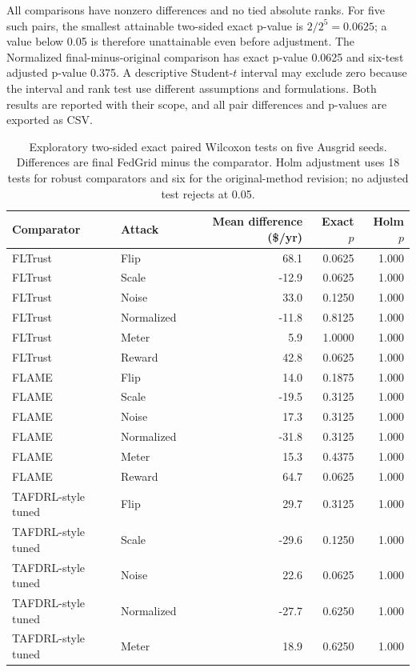 \documentclass[preprint,12pt,a4paper]{elsarticle}
\begin{document}
All comparisons have nonzero differences and no tied absolute ranks. For five such pairs, the smallest attainable two-sided exact p-value is $2/2^5=0.0625$; a value below 0.05 is therefore unattainable even before adjustment. The Normalized final-minus-original comparison has exact p-value 0.0625 and six-test adjusted p-value 0.375. A descriptive Student-$t$ interval may exclude zero because the interval and rank test use different assumptions and formulations. Both results are reported with their scope, and all pair differences and p-values are exported as CSV.

\begin{table}[htbp]
\centering\small
\caption{Exploratory two-sided exact paired Wilcoxon tests on five Ausgrid seeds. Differences are final FedGrid minus the comparator. Holm adjustment uses 18 tests for robust comparators and six for the original-method revision; no adjusted test rejects at 0.05.}
\label{tab:exact_statistics}
\begin{tabular}{llrrr}
\toprule
Comparator & Attack & Mean difference (\$/yr) & Exact $p$ & Holm $p$ \\
\midrule
FLTrust & Flip & 68.1 & 0.0625 & 1.000 \\
FLTrust & Scale & -12.9 & 0.0625 & 1.000 \\
FLTrust & Noise & 33.0 & 0.1250 & 1.000 \\
FLTrust & Normalized & -11.8 & 0.8125 & 1.000 \\
FLTrust & Meter & 5.9 & 1.0000 & 1.000 \\
FLTrust & Reward & 42.8 & 0.0625 & 1.000 \\
FLAME & Flip & 14.0 & 0.1875 & 1.000 \\
FLAME & Scale & -19.5 & 0.3125 & 1.000 \\
FLAME & Noise & 17.3 & 0.3125 & 1.000 \\
FLAME & Normalized & -31.8 & 0.3125 & 1.000 \\
FLAME & Meter & 15.3 & 0.4375 & 1.000 \\
FLAME & Reward & 64.7 & 0.0625 & 1.000 \\
TAFDRL-style tuned & Flip & 29.7 & 0.3125 & 1.000 \\
TAFDRL-style tuned & Scale & -29.6 & 0.1250 & 1.000 \\
TAFDRL-style tuned & Noise & 22.6 & 0.0625 & 1.000 \\
TAFDRL-style tuned & Normalized & -27.7 & 0.6250 & 1.000 \\
TAFDRL-style tuned & Meter & 18.9 & 0.6250 & 1.000 \\

\end{tabular}
\end{table}
\end{document}
